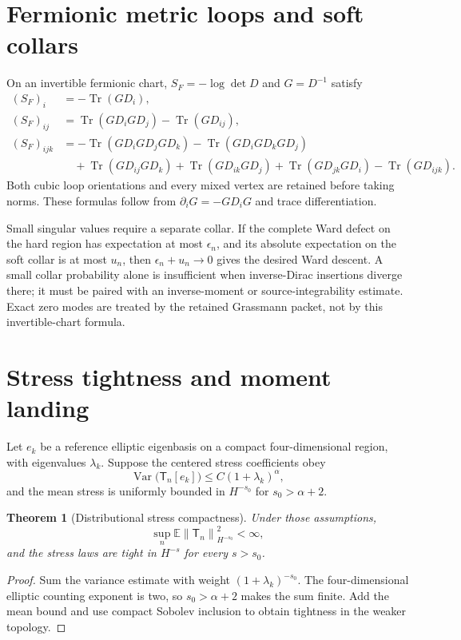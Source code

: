 \documentclass[11pt,a4paper,oneside]{book}
\theoremstyle{plain}
\newtheorem{theorem}{Theorem}[chapter]
\theoremstyle{definition}
\theoremstyle{remark}
\newcommand{\E}{\mathbb E}
\newcommand{\Tr}{\operatorname{Tr}}
\newcommand{\Var}{\operatorname{Var}}
\newcommand{\norm}[1]{\left\lVert#1\right\rVert}
\newcommand{\src}[2]{\cite{#1}}
\begin{document}
\section{Fermionic metric loops and soft collars}
On an invertible fermionic chart, $S_F=-\log\det D$ and $G=D^{-1}$ satisfy
\begin{align}
 (S_F)_i&=-\Tr(GD_i),\\
 (S_F)_{ij}&=\Tr(GD_iGD_j)-\Tr(GD_{ij}),\\
 (S_F)_{ijk}&=-\Tr(GD_iGD_jGD_k)-\Tr(GD_iGD_kGD_j)\nonumber\\
 &\quad+\Tr(GD_{ij}GD_k)+\Tr(GD_{ik}GD_j)
       +\Tr(GD_{jk}GD_i)-\Tr(GD_{ijk}).
 \label{eq:fermion-responses}
\end{align}
Both cubic loop orientations and every mixed vertex are retained before taking norms. These formulas follow from $\partial_iG=-GD_iG$ and trace differentiation. \src{R18}{thm:v18v44-det-responses}

Small singular values require a separate collar. If the complete Ward defect on the hard region has expectation at most $\epsilon_n$, and its absolute expectation on the soft collar is at most $u_n$, then $\epsilon_n+u_n\to0$ gives the desired Ward descent. A small collar probability alone is insufficient when inverse-Dirac insertions diverge there; it must be paired with an inverse-moment or source-integrability estimate. Exact zero modes are treated by the retained Grassmann packet, not by this invertible-chart formula. \src{R18}{thm:v18v45-ward-collar}

\section{Stress tightness and moment landing}
Let $e_k$ be a reference elliptic eigenbasis on a compact four-dimensional region, with eigenvalues $\lambda_k$. Suppose the centered stress coefficients obey
\begin{equation}
 \Var\bigl(\mathsf T_n[e_k]\bigr)\le C(1+\lambda_k)^\alpha,
\end{equation}
and the mean stress is uniformly bounded in $H^{-s_0}$ for $s_0>\alpha+2$.

\begin{theorem}[Distributional stress compactness]
\label{thm:stress-tightness}
Under those assumptions,
\begin{equation}
 \sup_n\E\norm{\mathsf T_n}_{H^{-s_0}}^2<\infty,
\end{equation}
and the stress laws are tight in $H^{-s}$ for every $s>s_0$.
\end{theorem}
\begin{proof}
Sum the variance estimate with weight $(1+\lambda_k)^{-s_0}$. The four-dimensional elliptic counting exponent is two, so $s_0>\alpha+2$ makes the sum finite. Add the mean bound and use compact Sobolev inclusion to obtain tightness in the weaker topology.
\end{proof}
\src{R18}{thm:v18v46-stress-tightness}
\end{document}
